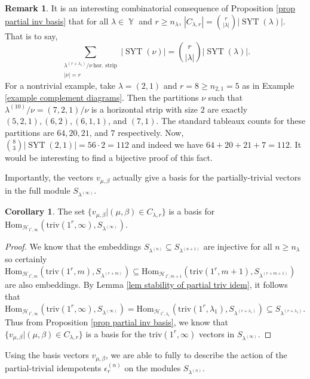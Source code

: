 \documentclass[12pt,reqno]{amsart}
\theoremstyle{definition}
\newtheorem{cor}[thm]{Corollary}
\newtheorem{remark}{Remark}
\DeclareMathOperator{\cH}{\mathcal{H}}
\DeclareMathOperator{\SYT}{\mathrm{SYT}}
\DeclareMathOperator{\Par}{\mathbb{Y}}
\begin{document}
\begin{remark}
    It is an interesting combinatorial consequence of Proposition \ref{prop partial inv basis} that for all $\lambda \in \Par$ and $r \geq n_{\lambda}$, $|C_{\lambda,r}| = \binom{r}{ |\lambda|} |\SYT(\lambda)|.$ That is to say, $$\sum_{\substack{\lambda^{(r+\lambda_1)}/\nu ~\text{hor. strip}\\ |\nu| = r}} |\SYT(\nu)| = \binom{r}{|\lambda|} |\SYT(\lambda)|.$$ For a nontrivial example, take $\lambda = (2,1)$ and $r = 8 \geq n_{2,1} = 5$ as in Example \ref{example complement diagrams}. Then the partitions $\nu$ such that $\lambda^{(10)}/\nu = (7,2,1)/\nu$ is a horizontal strip with size $2$ are exactly $(5,2,1),(6,2),(6,1,1)$, and $(7,1).$ The standard tableaux counts for these partitions are $64,20,21$, and $7$ respectively. Now, $\binom{8}{3} |\SYT(2,1)| = 56\cdot 2 = 112$ and indeed we have $64+20+21+7 = 112.$ It would be interesting to find a bijective proof of this fact.
\end{remark}

Importantly, the vectors $v_{\mu,\beta}$ actually give a basis for the partially-trivial vectors in the full module $S_{\lambda^{(\infty)}}.$

\begin{cor}\label{cor stable partial inv basis}
    The set $\{v_{\mu,\beta}| (\mu,\beta) \in C_{\lambda,r}\}$ is a basis for $\mathrm{Hom}_{\cH_{1^r,\infty}}(\mathrm{triv}(1^r,\infty),  S_{\lambda^{(\infty)}}).$
\end{cor}
\begin{proof}
    We know that the embeddings $S_{\lambda^{(n)}} \subseteq S_{\lambda^{(n+1)}}$ are injective for all $n \geq n_{\lambda}$ so certainly $\mathrm{Hom}_{\cH_{1^r,m}}(\mathrm{triv}(1^r,m),  S_{\lambda^{(r+m)}}) \subseteq \mathrm{Hom}_{\cH_{1^r,m+1}}(\mathrm{triv}(1^r,m+1),  S_{\lambda^{(r+m+1)}})$ are also embeddings. By Lemma \ref{lem stability of partial triv idem}, it follows that $\mathrm{Hom}_{\cH_{1^r,\infty}}(\mathrm{triv}(1^r,\infty),  S_{\lambda^{(\infty)}}) = \mathrm{Hom}_{\cH_{1^r,\lambda_1}}(\mathrm{triv}(1^r,\lambda_1),  S_{\lambda^{(r+\lambda_1)}}) \subseteq S_{\lambda^{(r+\lambda_1)}}.$ Thus from Proposition \ref{prop partial inv basis}, we know that $\{v_{\mu,\beta}| (\mu,\beta) \in C_{\lambda,r}\}$ is a basis for the $\mathrm{triv}(1^r,\infty)$ vectors in $S_{\lambda^{(\infty)}}$.
\end{proof}

Using the basis vectors $v_{\mu,\beta}$, we are able to fully to describe the action of the partial-trivial idempotents $\epsilon_{r}^{(n)}$ on the modules $S_{\lambda^{(n)}}.$
\end{document}
